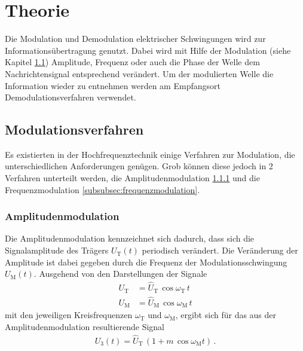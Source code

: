 \section{Theorie}
\label{sec:Theorie}
Die Modulation und Demodulation
elektrischer Schwingungen wird
zur Informationsübertragung genutzt.
Dabei wird mit Hilfe der Modulation
(siehe Kapitel \ref{subsec:modulationsverfahren})
Amplitude, Frequenz oder auch die Phase
der Welle dem Nachrichtensignal entsprechend
verändert.
Um der modulierten Welle die Information
wieder zu entnehmen werden am Empfangsort
Demodulationsverfahren verwendet.

\subsection{Modulationsverfahren}
\label{subsec:modulationsverfahren}
Es existierten in der Hochfrequenztechnik einige
Verfahren zur Modulation, die unterschiedlichen
Anforderungen genügen. Grob können diese
jedoch in 2 Verfahren unterteilt
werden, die Amplitudenmodulation \ref{subsubsec:amplitudenmodulation}
und die Frequenzmodulation \ref{subsubsec:frequenzmodulation}.

\subsubsection{Amplitudenmodulation}
\label{subsubsec:amplitudenmodulation}
Die Amplitudenmodulation kennzeichnet sich
dadurch, dass sich die Signalamplitude
des Trägers $U_{\text{T}}(t)$ periodisch verändert.
Die Veränderung der Amplitude ist dabei gegeben
durch die Frequenz der Modulationsschwingung
$U_{\text{M}}(t)$.
Ausgehend von den Darstellungen der Signale
\begin{align}
U_{\text{T}} &= \hat{U}_{\text{T}} \, \cos \omega_{\text{T}} \, t \\
U_{\text{M}} &= \hat{U}_{\text{M}} \, \cos \omega_{\text{M}} \, t
\end{align}
mit den jeweiligen Kreisfrequenzen $\omega_{\text{T}}$ und $\omega_{\text{M}}$,
ergibt sich für das aus der Amplitudenmodulation resultierende Signal
\begin{align}
\label{eqn:1}
U_{3}(t) = \hat{U}_{\text{T}} \, \left( 1 + m \, \cos \omega_{\text{M}} t \right) \, .
\end{align}

